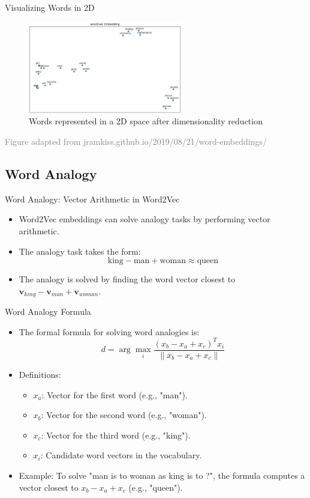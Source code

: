 \documentclass[serif, aspectratio=169]{beamer}
\begin{document}
\begin{frame}{Visualizing Words in 2D}
	\begin{figure}
		\centering
		\includegraphics[width=0.6\textwidth]{pic/word2vec_embedding.png}
		\caption*{Words represented in a 2D space after dimensionality reduction}
	\end{figure}
	\vspace{0.6cm}
	\hspace{-1.0cm}
	{\tiny \textcolor{gray}{Figure adapted from jramkiss.github.io/2019/08/21/word-embeddings/}}
\end{frame}

\subsection{Word Analogy}

\begin{frame}{Word Analogy: Vector Arithmetic in Word2Vec}
    \begin{itemize}
        \item Word2Vec embeddings can solve analogy tasks by performing vector arithmetic.
        \item The analogy task takes the form:
        \[
        \text{king} - \text{man} + \text{woman} \approx \text{queen}
        \]
        \item The analogy is solved by finding the word vector closest to \( \mathbf{v}_{king} - \mathbf{v}_{man} + \mathbf{v}_{woman} \).
    \end{itemize}
\end{frame}


\begin{frame}{Word Analogy Formula}
	\begin{itemize}
		\item The formal formula for solving word analogies is:
		\[
		d = \arg\max_i \frac{(x_b - x_a + x_c)^T x_i}{\|x_b - x_a + x_c\|}
		\]
		\item Definitions:
		\begin{itemize}
			\item \(x_a\): Vector for the first word (e.g., "man").
			\item \(x_b\): Vector for the second word (e.g., "woman").
			\item \(x_c\): Vector for the third word (e.g., "king").
			\item \(x_i\): Candidate word vectors in the vocabulary.
		\end{itemize}
		\item Example: To solve "man is to woman as king is to ?", the formula computes a vector closest to \(x_b - x_a + x_c\) (e.g., "queen").
	\end{itemize}
\end{frame}
\end{document}
